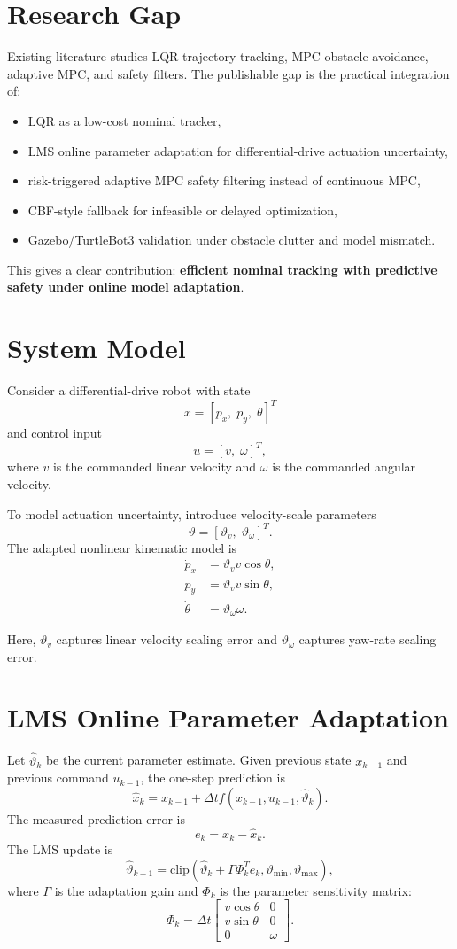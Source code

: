 \documentclass[11pt,a4paper]{article}
\begin{document}
\section{Research Gap}
Existing literature studies LQR trajectory tracking, MPC obstacle avoidance, adaptive MPC, and safety filters. The publishable gap is the practical integration of:
\begin{itemize}
    \item LQR as a low-cost nominal tracker,
    \item LMS online parameter adaptation for differential-drive actuation uncertainty,
    \item risk-triggered adaptive MPC safety filtering instead of continuous MPC,
    \item CBF-style fallback for infeasible or delayed optimization,
    \item Gazebo/TurtleBot3 validation under obstacle clutter and model mismatch.
\end{itemize}

This gives a clear contribution: \textbf{efficient nominal tracking with predictive safety under online model adaptation}.

\section{System Model}
Consider a differential-drive robot with state
\[
x = [p_x,\;p_y,\;\theta]^T
\]
and control input
\[
u = [v,\;\omega]^T,
\]
where $v$ is the commanded linear velocity and $\omega$ is the commanded angular velocity.

To model actuation uncertainty, introduce velocity-scale parameters
\[
\vartheta = [\vartheta_v,\;\vartheta_\omega]^T.
\]
The adapted nonlinear kinematic model is
\begin{align}
\dot{p}_x &= \vartheta_v v \cos\theta, \\
\dot{p}_y &= \vartheta_v v \sin\theta, \\
\dot{\theta} &= \vartheta_\omega \omega.
\end{align}

Here, $\vartheta_v$ captures linear velocity scaling error and $\vartheta_\omega$ captures yaw-rate scaling error.

\section{LMS Online Parameter Adaptation}
Let $\hat{\vartheta}_k$ be the current parameter estimate. Given previous state $x_{k-1}$ and previous command $u_{k-1}$, the one-step prediction is
\[
\hat{x}_k = x_{k-1} + \Delta t f(x_{k-1},u_{k-1},\hat{\vartheta}_k).
\]
The measured prediction error is
\[
e_k = x_k - \hat{x}_k.
\]
The LMS update is
\[
\hat{\vartheta}_{k+1}
= \mathrm{clip}\left(
\hat{\vartheta}_{k} + \Gamma \Phi_k^T e_k,
\vartheta_{\min},
\vartheta_{\max}
\right),
\]
where $\Gamma$ is the adaptation gain and $\Phi_k$ is the parameter sensitivity matrix:
\[
\Phi_k =
\Delta t
\begin{bmatrix}
v \cos\theta & 0 \\
v \sin\theta & 0 \\
0 & \omega
\end{bmatrix}.
\]
\end{document}
